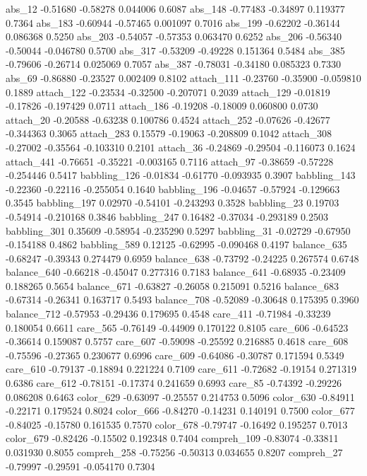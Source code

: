 \documentclass[10pt, letterpaper]{article}
\begin{document}
abs\_12 -0.51680 -0.58278 0.044006 0.6087 abs\_148 -0.77483 -0.34897
0.119377 0.7364 abs\_183 -0.60944 -0.57465 0.001097 0.7016 abs\_199
-0.62202 -0.36144 0.086368 0.5250 abs\_203 -0.54057 -0.57353 0.063470
0.6252 abs\_206 -0.56340 -0.50044 -0.046780 0.5700 abs\_317 -0.53209
-0.49228 0.151364 0.5484 abs\_385 -0.79606 -0.26714 0.025069 0.7057
abs\_387 -0.78031 -0.34180 0.085323 0.7330 abs\_69 -0.86880 -0.23527
0.002409 0.8102 attach\_111 -0.23760 -0.35900 -0.059810 0.1889
attach\_122 -0.23534 -0.32500 -0.207071 0.2039 attach\_129 -0.01819
-0.17826 -0.197429 0.0711 attach\_186 -0.19208 -0.18009 0.060800 0.0730
attach\_20 -0.20588 -0.63238 0.100786 0.4524 attach\_252 -0.07626
-0.42677 -0.344363 0.3065 attach\_283 0.15579 -0.19063 -0.208809 0.1042
attach\_308 -0.27002 -0.35564 -0.103310 0.2101 attach\_36 -0.24869
-0.29504 -0.116073 0.1624 attach\_441 -0.76651 -0.35221 -0.003165 0.7116
attach\_97 -0.38659 -0.57228 -0.254446 0.5417 babbling\_126 -0.01834
-0.61770 -0.093935 0.3907 babbling\_143 -0.22360 -0.22116 -0.255054
0.1640 babbling\_196 -0.04657 -0.57924 -0.129663 0.3545 babbling\_197
0.02970 -0.54101 -0.243293 0.3528 babbling\_23 0.19703 -0.54914
-0.210168 0.3846 babbling\_247 0.16482 -0.37034 -0.293189 0.2503
babbling\_301 0.35609 -0.58954 -0.235290 0.5297 babbling\_31 -0.02729
-0.67950 -0.154188 0.4862 babbling\_589 0.12125 -0.62995 -0.090468
0.4197 balance\_635 -0.68247 -0.39343 0.274479 0.6959 balance\_638
-0.73792 -0.24225 0.267574 0.6748 balance\_640 -0.66218 -0.45047
0.277316 0.7183 balance\_641 -0.68935 -0.23409 0.188265 0.5654
balance\_671 -0.63827 -0.26058 0.215091 0.5216 balance\_683 -0.67314
-0.26341 0.163717 0.5493 balance\_708 -0.52089 -0.30648 0.175395 0.3960
balance\_712 -0.57953 -0.29436 0.179695 0.4548 care\_411 -0.71984
-0.33239 0.180054 0.6611 care\_565 -0.76149 -0.44909 0.170122 0.8105
care\_606 -0.64523 -0.36614 0.159087 0.5757 care\_607 -0.59098 -0.25592
0.216885 0.4618 care\_608 -0.75596 -0.27365 0.230677 0.6996 care\_609
-0.64086 -0.30787 0.171594 0.5349 care\_610 -0.79137 -0.18894 0.221224
0.7109 care\_611 -0.72682 -0.19154 0.271319 0.6386 care\_612 -0.78151
-0.17374 0.241659 0.6993 care\_85 -0.74392 -0.29226 0.086208 0.6463
color\_629 -0.63097 -0.25557 0.214753 0.5096 color\_630 -0.84911
-0.22171 0.179524 0.8024 color\_666 -0.84270 -0.14231 0.140191 0.7500
color\_677 -0.84025 -0.15780 0.161535 0.7570 color\_678 -0.79747
-0.16492 0.195257 0.7013 color\_679 -0.82426 -0.15502 0.192348 0.7404
compreh\_109 -0.83074 -0.33811 0.031930 0.8055 compreh\_258 -0.75256
-0.50313 0.034655 0.8207 compreh\_27 -0.79997 -0.29591 -0.054170 0.7304
\end{document}
